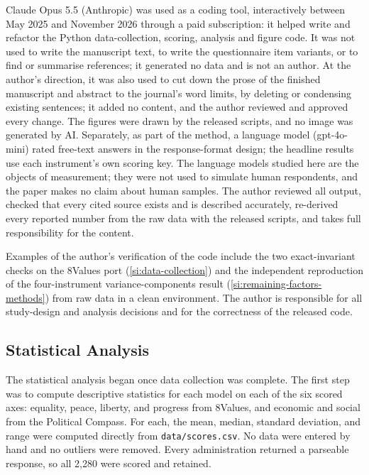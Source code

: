 \documentclass[12pt]{article}
\begin{document}
Claude Opus 5.5 (Anthropic) was used as a coding tool, interactively between May 2025 and November 2026 through a paid subscription: it helped write and refactor the Python data-collection, scoring, analysis and figure code. It was not used to write the manuscript text, to write the questionnaire item variants, or to find or summarise references; it generated no data and is not an author. At the author's direction, it was also used to cut down the prose of the finished manuscript and abstract to the journal's word limits, by deleting or condensing existing sentences; it added no content, and the author reviewed and approved every change. The figures were drawn by the released scripts, and no image was generated by AI. Separately, as part of the method, a language model (gpt-4o-mini) rated free-text answers in the response-format design; the headline results use each instrument's own scoring key. The language models studied here are the objects of measurement; they were not used to simulate human respondents, and the paper makes no claim about human samples. The author reviewed all output, checked that every cited source exists and is described accurately, re-derived every reported number from the raw data with the released scripts, and takes full responsibility for the content.

Examples of the author's verification of the code include the two exact-invariant checks on the 8Values port (\ref{si:data-collection})
and the independent reproduction of the four-instrument variance-components
result (\ref{si:remaining-factors-methods}) from raw data in a clean
environment. The author is responsible for all study-design and
analysis decisions and for the correctness of the released code.

\subsection{Statistical Analysis}
\label{si:stats}

The statistical analysis began once data collection was complete. The first step was to compute
descriptive statistics for each model on each of the six scored axes: equality, peace, liberty, and progress
from 8Values, and economic and social from the Political Compass. For each, the mean, median,
standard deviation, and range were computed directly from \texttt{data/scores.csv}. No data were entered by
hand and no outliers were removed. Every administration returned a parseable response, so all 2{,}280
were scored and retained.
\end{document}
